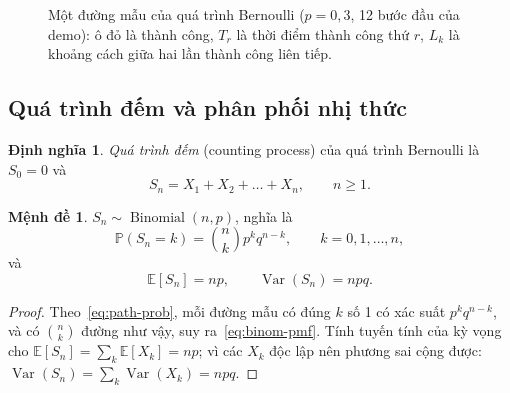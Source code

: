\documentclass[12pt,a4paper]{article}
\theoremstyle{definition}
\newtheorem{definition}{Định nghĩa}[section]
\newtheorem{proposition}{Mệnh đề}[section]
\theoremstyle{remark}
\newcommand{\Prob}{\mathbb{P}}
\newcommand{\E}{\mathbb{E}}
\newcommand{\Var}{\operatorname{Var}}
\newcommand{\Bin}{\operatorname{Binomial}}
\begin{document}
\begin{figure}[ht]
\centering
{}
\caption{Một đường mẫu của quá trình Bernoulli ($p=0{,}3$, 12 bước đầu của demo): ô đỏ là thành công,
$T_r$ là thời điểm thành công thứ $r$, $L_k$ là khoảng cách giữa hai lần thành công liên tiếp.}
\label{fig:timeline}
\end{figure}

\subsection{Quá trình đếm và phân phối nhị thức}
\begin{definition}
\emph{Quá trình đếm} (counting process) của quá trình Bernoulli là $S_0 = 0$ và
\begin{equation}\label{eq:Sn}
  S_n = X_1 + X_2 + \dots + X_n, \qquad n \ge 1.
\end{equation}
\end{definition}

\begin{proposition}\label{prop:binomial}
$S_n \sim \Bin(n,p)$, nghĩa là
\begin{equation}\label{eq:binom-pmf}
  \Prob(S_n = k) = \binom{n}{k} p^k q^{n-k}, \qquad k = 0,1,\dots,n,
\end{equation}
và
\begin{equation}\label{eq:binom-moments}
  \E[S_n] = np, \qquad \Var(S_n) = npq.
\end{equation}
\end{proposition}
\begin{proof}
Theo~\eqref{eq:path-prob}, mỗi đường mẫu có đúng $k$ số 1 có xác suất $p^kq^{n-k}$, và có $\binom{n}{k}$ đường
như vậy, suy ra~\eqref{eq:binom-pmf}. Tính tuyến tính của kỳ vọng cho $\E[S_n] = \sum_k \E[X_k] = np$; vì các
$X_k$ độc lập nên phương sai cộng được: $\Var(S_n) = \sum_k \Var(X_k) = npq$.
\end{proof}
\end{document}
